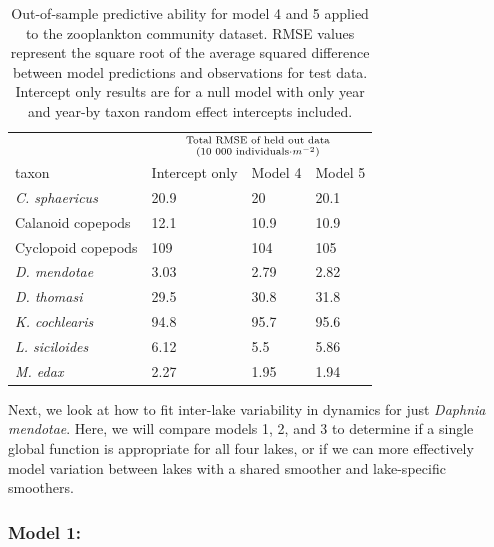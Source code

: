 \documentclass[12pt]{article}
\begin{document}
\begin{table}

\caption{\label{tab:zoo_comm_outofsample_kable}Out-of-sample predictive ability for model 4 and 5 applied to the zooplankton community dataset. RMSE values represent the square root of the average squared difference between model predictions and observations for test data.  Intercept only results are for a null model with only year and year-by taxon random effect intercepts included.}
\centering
\begin{tabular}[t]{llll}
\toprule
\multicolumn{1}{c}{ } & \multicolumn{3}{c}{\Large{${\text{Total RMSE of held out data}}\atop{(\text{10 000 individuals}\cdot m^{-2})}$}} \\
\cmidrule(l{2pt}r{2pt}){2-4}
taxon & Intercept only & Model 4 & Model 5\\
\midrule
\em{C. sphaericus} & 20.9 & 20 & 20.1\\
Calanoid copepods & 12.1 & 10.9 & 10.9\\
Cyclopoid copepods & 109 & 104 & 105\\
\em{D. mendotae} & 3.03 & 2.79 & 2.82\\
\em{D. thomasi} & 29.5 & 30.8 & 31.8\\
\addlinespace
\em{K. cochlearis} & 94.8 & 95.7 & 95.6\\
\em{L. siciloides} & 6.12 & 5.5 & 5.86\\
\em{M. edax} & 2.27 & 1.95 & 1.94\\
\bottomrule
\end{tabular}
\end{table}

Next, we look at how to fit inter-lake variability in dynamics for just
\emph{Daphnia mendotae}. Here, we will compare models 1, 2, and 3 to
determine if a single global function is appropriate for all four lakes,
or if we can more effectively model variation between lakes with a
shared smoother and lake-specific smoothers.

\subsubsection{Model 1:}\label{model-1}
\end{document}
